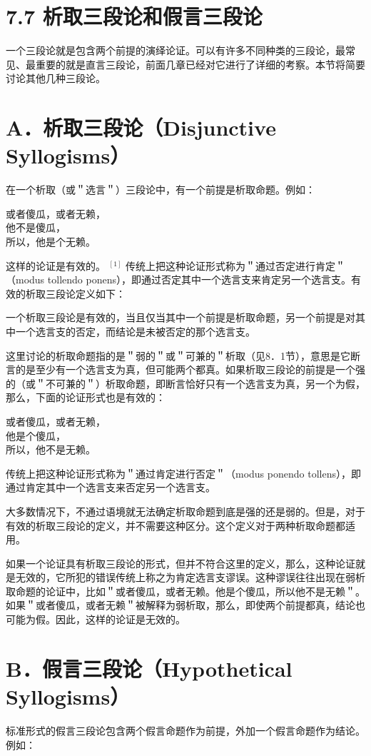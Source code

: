\section*{7.7 析取三段论和假言三段论}
一个三段论就是包含两个前提的演绎论证。可以有许多不同种类的三段论，最常见、最重要的就是直言三段论，前面几章已经对它进行了详细的考察。本节将简要讨论其他几种三段论。

\section*{A．析取三段论（Disjunctive Syllogisms）}
在一个析取（或＂选言＂）三段论中，有一个前提是析取命题。例如：

或者傻瓜，或者无赖，\\
他不是傻瓜，\\
所以，他是个无赖。

这样的论证是有效的。 ${ }^{[1]}$ 传统上把这种论证形式称为＂通过否定进行肯定＂（modus tollendo ponens），即通过否定其中一个选言支来肯定另一个选言支。有效的析取三段论定义如下：

一个析取三段论是有效的，当且仅当其中一个前提是析取命题，另一个前提是对其中一个选言支的否定，而结论是未被否定的那个选言支。

这里讨论的析取命题指的是＂弱的＂或＂可兼的＂析取（见8．1节），意思是它断言的是至少有一个选言支为真，但可能两个都真。如果析取三段论的前提是一个强的（或＂不可兼的＂）析取命题，即断言恰好只有一个选言支为真，另一个为假，那么，下面的论证形式也是有效的：

或者傻瓜，或者无赖，\\
他是个傻瓜，\\
所以，他不是无赖。

传统上把这种论证形式称为＂通过肯定进行否定＂（modus ponendo tollens），即通过肯定其中一个选言支来否定另一个选言支。

大多数情况下，不通过语境就无法确定析取命题到底是强的还是弱的。但是，对于有效的析取三段论的定义，并不需要这种区分。这个定义对于两种析取命题都适用。

如果一个论证具有析取三段论的形式，但并不符合这里的定义，那么，这种论证就是无效的，它所犯的错误传统上称之为肯定选言支谬误。这种谬误往往出现在弱析取命题的论证中，比如＂或者傻瓜，或者无赖。他是个傻瓜，所以他不是无赖＂。如果＂或者傻瓜，或者无赖＂被解释为弱析取，那么，即使两个前提都真，结论也可能为假。因此，这样的论证是无效的。

\section*{B．假言三段论（Hypothetical Syllogisms）}
标准形式的假言三段论包含两个假言命题作为前提，外加一个假言命题作为结论。例如：

